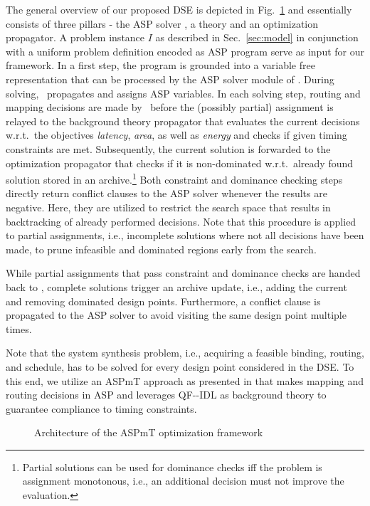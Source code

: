 The general overview of our proposed \ac{DSE} is depicted in Fig.~\ref{fig:architecture} and essentially consists of three pillars - the \ac{ASP} solver \clingo, a theory and an optimization propagator. A problem instance $I$ as described in Sec.~\ref{sec:model} in conjunction with a uniform problem definition encoded as \ac{ASP} program serve as input for our framework. In a first step, the program is grounded into a variable free representation that can be processed by the \ac{ASP} solver module of \clingo. During solving, \clingo\ propagates and assigns \ac{ASP} variables. In each solving step, routing and mapping decisions are made by \clingo\ before the (possibly partial) assignment is relayed to the background theory propagator that evaluates the current decisions w.r.t.~the objectives \emph{latency}, \emph{area}, as well as \emph{energy} and checks if given timing constraints are met. Subsequently, the current solution is forwarded to the optimization propagator that checks if it is non-dominated w.r.t.~already found solution stored in an archive.\footnote{Partial solutions can be used for dominance checks iff the problem is assignment monotonous, i.e., an additional decision must not improve the evaluation.}  Both constraint and dominance checking steps directly return conflict clauses to the \ac{ASP} solver whenever the results are negative. Here, they are utilized to restrict the search space that results in backtracking of already performed decisions. Note that this procedure is applied to partial assignments, i.e., incomplete solutions where not all decisions have been made, to prune infeasible and dominated regions early from the search. \par 
While partial assignments that pass constraint and dominance checks are handed back to \clingo, complete solutions trigger an archive update, i.e., adding the current and removing dominated design points. Furthermore, a conflict clause is propagated to the ASP solver to avoid visiting the same design point multiple times.\par 
Note that the system synthesis problem, i.e., acquiring a feasible binding, routing, and schedule, has to be solved for every design point considered in the \ac{DSE}. To this end, we utilize an \ac{ASPmT} approach as presented in \cite{Neubauer2017} that makes mapping and routing decisions in \ac{ASP} and leverages \ac{QF--IDL} as background theory to guarantee compliance to timing constraints. 
\begin{figure}
	\centering
	\resizebox{0.8\linewidth}{!}{}
	\vspace*{-0.1cm}
	\caption{Architecture of the ASPmT optimization framework}
	\label{fig:architecture}
\end{figure}
